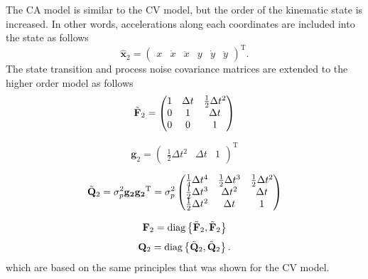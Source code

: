 \documentclass[english, 12pt, a4paper, elec, utf8, a-1b, online]{aaltothesis}
\renewcommand{\vec}[1]{\mathbf{#1}}
\newcommand{\transpose}[1]{#1^\text{T}}
\newcommand{\dt}{\Delta t}
\newcommand{\diag}[1]{\text{diag}\left\{ #1 \right\}}
\begin{document}
The CA model is similar to the CV model, but the order of the kinematic state is increased.
In other words, accelerations along each coordinates are included into the state as follows  
\begin{equation}\label{eq:x_mode2}
    \hat{\mathbf{x}}_2 =
        \transpose{
        \begin{pmatrix}
            x & \dot{x} & \ddot{x} & y & \dot{y} & \ddot{y}
        \end{pmatrix}}.
\end{equation}
The state transition and process noise covariance matrices are extended to the higher order model as follows    
\begin{equation}\label{eq:f_mode2}
    \Tilde{\vec{F}}_2 = 
    \begin{pmatrix}
        1 & \dt & \frac{1}{2}\dt^2  \\ 
        0 & 1 & \dt \\
        0 & 0 & 1  \\
    \end{pmatrix}
\end{equation}

\begin{equation}
    \vec{g}_2 = \transpose{
        \begin{pmatrix}
            \frac{1}{2} \dt^2 & \dt & 1
        \end{pmatrix}
    }
\end{equation}

\begin{equation}
    \Tilde{\vec{Q}}_2 = \sigma_p^2 \vec{g_2} \transpose{\vec{g_2}}  =  \sigma_p^2
        \begin{pmatrix}
            \frac{1}{4} \dt^4 & \frac{1}{2} \dt^3 & \frac{1}{2} \dt^2 \\ 
            \frac{1}{2} \dt^3 & \dt^2 &  \dt \\
            \frac{1}{2} \dt^2 & \dt & 1
        \end{pmatrix}
\end{equation}

\begin{equation}\label{eq:F_mode2}
\vec{F}_2 = \diag{\Tilde{\vec{F}}_2, \Tilde{\vec{F}}_2}
\end{equation}
\begin{equation}
    \vec{Q}_2 = \diag{\Tilde{\vec{Q}}_2, \Tilde{\vec{Q}}_2}.
\end{equation}
which are based on the same principles that was shown for the CV model.
\end{document}
